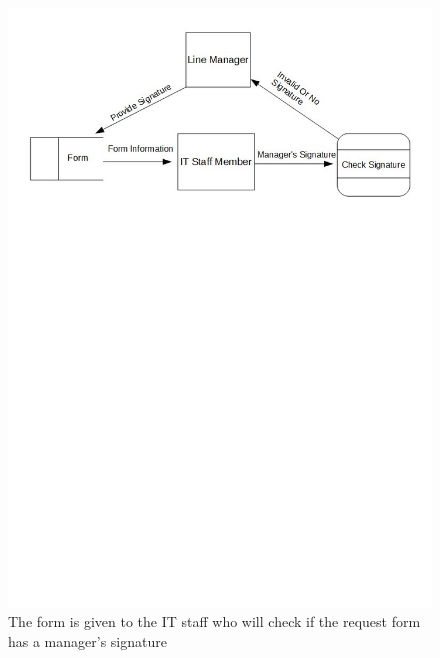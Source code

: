 \begin{figure}[H]
\includegraphics[width=\textwidth]{dataflowdiagram2.jpg}
\caption{The form is given to the IT staff who will check if the request form has a manager's signature } \label{Page1Interview}
\end{figure}

